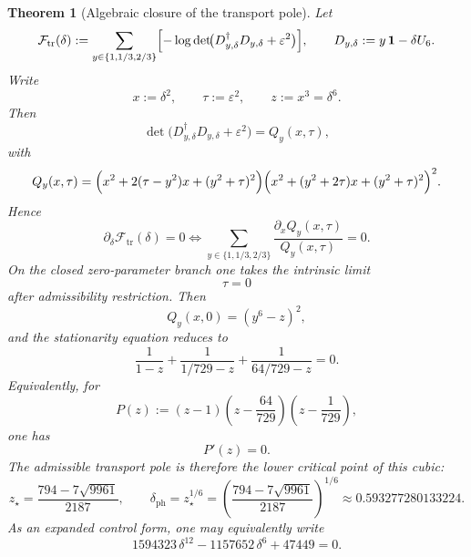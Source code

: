 \documentclass[11pt,a4paper]{article}
\newtheorem{theorem}{Theorem}[section]
\theoremstyle{definition}
\theoremstyle{remark}
\begin{document}
\begin{theorem}[Algebraic closure of the transport pole]
\label{prop:closed-form-transport-pole}
\label{thm:algebraic-transport-pole}
\label{thm:transport-pole-algebraic}
Let
\[
\mathcal F_{\mathrm{tr}}(\delta)
:=
\sum_{y\in\{1,1/3,2/3\}}
\Bigl[-\log\det\!\bigl(D_{y,\delta}^\dagger D_{y,\delta}+\varepsilon^2\bigr)\Bigr],
\qquad
D_{y,\delta}:=y\,\mathbf 1-\delta U_6.
\]
Write
\[
x:=\delta^2,
\qquad
\tau:=\varepsilon^2,
\qquad
z:=x^3=\delta^6.
\]
Then
\[
\det\!\bigl(D_{y,\delta}^\dagger D_{y,\delta}+\varepsilon^2\bigr)
=
Q_y(x,\tau),
\]
with
\[
Q_y(x,\tau)
=
\Bigl(x^2+2(\tau-y^2)x+(y^2+\tau)^2\Bigr)
\Bigl(x^2+(y^2+2\tau)x+(y^2+\tau)^2\Bigr)^2.
\]
Hence
\[
\partial_\delta \mathcal F_{\mathrm{tr}}(\delta)=0
\iff
\sum_{y\in\{1,1/3,2/3\}}
\frac{\partial_x Q_y(x,\tau)}{Q_y(x,\tau)}=0.
\]
On the closed zero-parameter branch one takes the intrinsic limit
\[
\tau=0
\]
after admissibility restriction. Then
\[
Q_y(x,0)=(y^6-z)^2,
\]
and the stationarity equation reduces to
\[
\frac{1}{1-z}
+
\frac{1}{1/729-z}
+
\frac{1}{64/729-z}
=0.
\]
Equivalently, for
\[
P(z):=
(z-1)\left(z-\frac{64}{729}\right)\left(z-\frac{1}{729}\right),
\]
one has
\[
P'(z)=0.
\]
The admissible transport pole is therefore the lower critical point of this cubic:
\[
z_\star
=
\frac{794-7\sqrt{9961}}{2187},
\qquad
\delta_{\mathrm{ph}}=z_\star^{1/6}
=
\left(\frac{794-7\sqrt{9961}}{2187}\right)^{1/6}
\approx \num{0.593277280133224}.
\]
As an expanded control form, one may equivalently write
\[
1594323\,\delta^{12}-1157652\,\delta^6+47449=0.
\]
\end{theorem}
\end{document}
